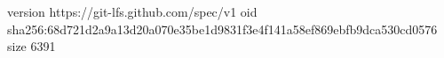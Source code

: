 version https://git-lfs.github.com/spec/v1
oid sha256:68d721d2a9a13d20a070e35be1d9831f3e4f141a58ef869ebfb9dca530cd0576
size 6391
